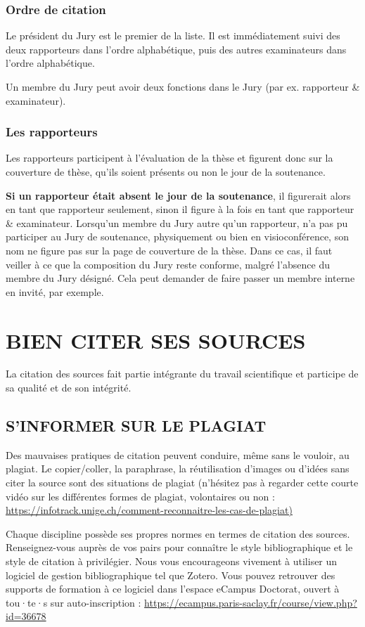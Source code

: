 \documentclass[french,12pt,a4paper]{book}
\begin{document}
\subsection{Ordre de citation}
Le président du Jury est le premier de la liste. Il est immédiatement suivi des deux rapporteurs dans l’ordre alphabétique, puis des autres examinateurs dans l’ordre alphabétique.\\ \par
Un membre du Jury peut avoir deux fonctions dans le Jury (par ex. rapporteur \& examinateur).
\subsection{Les rapporteurs}
Les rapporteurs participent à l’évaluation de la thèse et figurent donc sur la couverture de thèse, qu’ils soient présents ou non le jour de la soutenance.\\ \par 
\textbf{Si un rapporteur était absent le jour de la soutenance}, il figurerait alors en tant que rapporteur seulement, sinon il figure à la fois en tant que rapporteur \& examinateur.
Lorsqu’un membre du Jury autre qu’un rapporteur, n’a pas pu participer au Jury de soutenance, physiquement ou bien en visioconférence, son nom ne figure pas sur la page de couverture de la thèse. Dans ce cas, il faut veiller à ce que la composition du Jury reste conforme, malgré l’absence du membre du Jury désigné. Cela peut demander de faire passer un membre interne en invité, par exemple.

\chapter{BIEN CITER SES SOURCES}
La citation des sources fait partie intégrante du travail scientifique et participe de sa qualité et de son intégrité.
\section{S'INFORMER SUR LE PLAGIAT}
Des mauvaises pratiques de citation peuvent conduire, même sans le vouloir, au plagiat. Le copier/coller, la paraphrase, la réutilisation d’images ou d’idées sans citer la source sont des situations de plagiat (n’hésitez pas à regarder cette courte vidéo sur les différentes formes de plagiat, volontaires ou non : \url{https://infotrack.unige.ch/comment-reconnaitre-les-cas-de-plagiat)}\\ \par
Chaque discipline possède ses propres normes en termes de citation des sources. Renseignez-vous auprès de vos pairs pour connaître le style bibliographique et le style de citation à privilégier. Nous vous encourageons vivement à utiliser un logiciel de gestion bibliographique tel que Zotero. Vous pouvez retrouver des supports de formation à ce logiciel dans l’espace eCampus Doctorat, ouvert à tou·te·s sur auto-inscription : \url{https://ecampus.paris-saclay.fr/course/view.php?id=36678}
\end{document}
